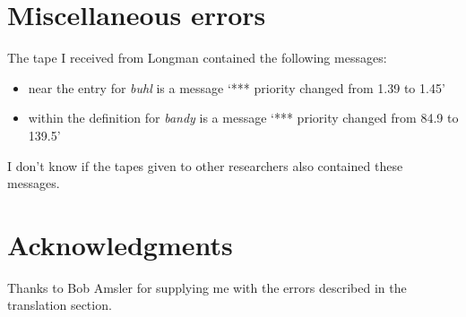 \section{Miscellaneous errors}
The tape I received from Longman contained the following messages:

\begin{itemize}

\item near the entry for {\it buhl} is a message `*** priority changed from 1.39
   to  1.45'  

\item within the definition for {\it bandy} is a message `*** priority changed
   from 84.9 to 139.5'

\end{itemize}

I don't know if the tapes given to other researchers also contained these
messages.

\section{Acknowledgments}
Thanks to Bob Amsler for supplying me with the errors described in the
translation section.





